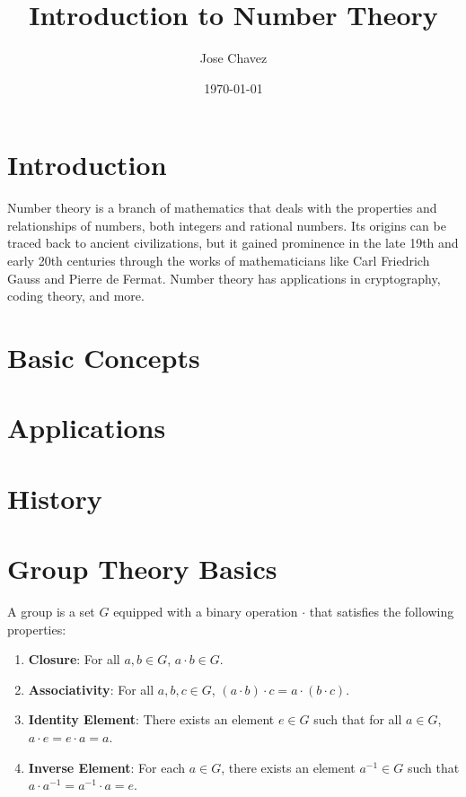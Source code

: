 \documentclass{article}
\title{Introduction to Number Theory}
\author{Jose Chavez}
\date{\today}
\begin{document}
\maketitle

\section{Introduction}

Number theory is a branch of mathematics that deals with the properties and relationships of numbers, both integers and rational numbers. Its origins can be traced back to ancient civilizations, but it gained prominence in the late 19th and early 20th centuries through the works of mathematicians like Carl Friedrich Gauss and Pierre de Fermat. Number theory has applications in cryptography, coding theory, and more.

\section{Basic Concepts}


\section{Applications}


\section{History}




\section{Group Theory Basics}

\begin{definition}
A group is a set $G$ equipped with a binary operation $\cdot$ that satisfies the following properties:
\begin{enumerate}
    \item \textbf{Closure}: For all $a, b \in G$, $a \cdot b \in G$.
    \item \textbf{Associativity}: For all $a, b, c \in G$, $(a \cdot b) \cdot c = a \cdot (b \cdot c)$.
    \item \textbf{Identity Element}: There exists an element $e \in G$ such that for all $a \in G$, $a \cdot e = e \cdot a = a$.
    \item \textbf{Inverse Element}: For each $a \in G$, there exists an element $a^{-1} \in G$ such that $a \cdot a^{-1} = a^{-1} \cdot a = e$.
\end{enumerate}
\end{definition}
\end{document}
